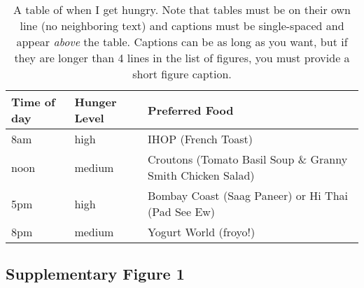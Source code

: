 \vspace{0.25in}
\begin{table}[!ht]
\caption[Short figure caption (must be  lines in the list of tables)]{A table of when I get hungry.  Note that tables must be on their own line (no neighboring text) and captions must be single-spaced and appear \protect\textit{above} the table.  Captions can be as long as you want, but if they are longer than 4 lines in the list of figures, you must provide a short figure caption.}

\vspace{-0.25in}
\begin{center}
\begin{tabular}{|p{1in}|p{2in}|p{3in}|}

\hline
Time of day & Hunger Level & Preferred Food \\

\hline
8am & high & IHOP (French Toast) \\

\hline
noon & medium & Croutons (Tomato Basil Soup \& Granny Smith Chicken Salad) \\

\hline
5pm & high & Bombay Coast (Saag Paneer) or Hi Thai (Pad See Ew) \\

\hline
8pm & medium & Yogurt World (froyo!) \\

\hline
\end{tabular}
\end{center}
\label{tab:analysis3}
\end{table}

\subsection{Supplementary Figure 1}


